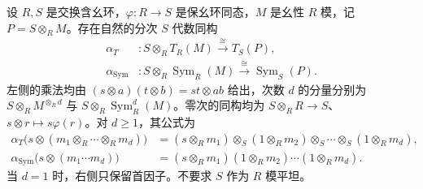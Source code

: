 \begin{proposition}\label{b2:prop:tensor-symmetric-base-change}
	设 \(R,S\) 是交换含幺环，\(\varphi:R\to S\) 是保幺环同态，\(M\) 是幺性 \(R\) 模，记 \(P=S\otimes_RM\)。存在自然的分次 \(S\) 代数同构
	\[
		\begin{aligned}
			\alpha_T&:S\otimes_RT_R(M)\xrightarrow{\ \cong\ }T_S(P),\\
			\alpha_{\mathrm{Sym}}&:S\otimes_R\operatorname{Sym}_R(M) \xrightarrow{\ \cong\ }\operatorname{Sym}_S(P).
		\end{aligned}
	\]
	左侧的乘法均由 \((s\otimes a)(t\otimes b)=st\otimes ab\) 给出，次数 \(d\) 的分量分别为 \(S\otimes_RM^{\otimes_Rd}\) 与 \(S\otimes_R\operatorname{Sym}_R^d(M)\)。零次的同构均为 \(S\otimes_RR\to S\)、\(s\otimes r\mapsto s\varphi(r)\)。对 \(d\ge1\)，其公式为
	\[
		\begin{aligned}
			\alpha_T\bigl(s\otimes(m_1\otimes_R\cdots\otimes_Rm_d)\bigr) &=(s\otimes_Rm_1)\otimes_S(1\otimes_Rm_2) \otimes_S\cdots\otimes_S(1\otimes_Rm_d),\\
			\alpha_{\mathrm{Sym}}\bigl(s\otimes(m_1\cdots m_d)\bigr) &=(s\otimes_Rm_1)(1\otimes_Rm_2)\cdots(1\otimes_Rm_d).
		\end{aligned}
	\]
	当 \(d=1\) 时，右侧只保留首因子。不要求 \(S\) 作为 \(R\) 模平坦。
\end{proposition}
